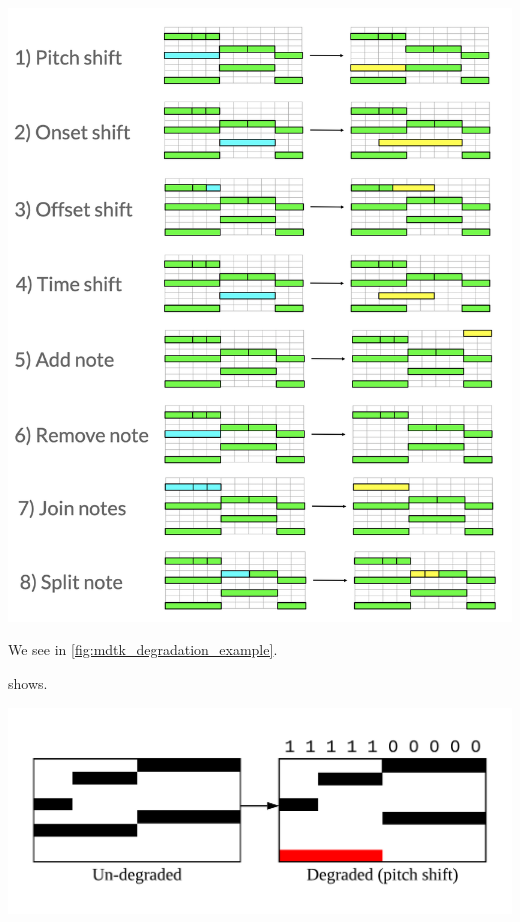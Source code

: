 \documentclass[12pt,a4paper,]{report}
\let\origfigure=\figure
\let\endorigfigure=\endfigure
\renewenvironment{figure}[1][]{%
\origfigure[b]
}{%
\endorigfigure
}
\begin{document}
\begin{figure}[htbp]
\centering
\includegraphics[width=1.0\textwidth]{source/figures/mdtk_degradations.png}
\caption[The degradations available in MDTK]{Illustrations for all the degradations currently available in MDTK}\label{fig:mdtk_degradations}
\end{figure}

We see in \ref{fig:mdtk_degradation_example}.

 shows.

\begin{figure}[htbp]
\centering
\includegraphics[width=1.0\textwidth]{source/figures/example.png}
\caption[Example MDTK degradation]{An example degradation performed by MDTK}\label{fig:mdtk_degradation_example}
\end{figure}
\end{document}

